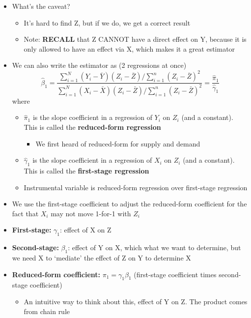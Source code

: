 \documentclass[10pt, oneside]{article}
\begin{document}
\begin{itemize}
\begin{itemize}
\begin{itemize}
        \end{itemize}
        \item What's the caveat?
        \begin{itemize}
            \item It's hard to find Z, but if we do, we get a correct result
            \item Note: \textbf{RECALL} that Z CANNOT have a direct effect on Y, because it is only allowed to have an effect via X, which makes it a great estimator
        \end{itemize}
        \item We can also write the estimator as (2 regressions at once)
        \[ \hat \beta_1 = \frac{\sum_{i=1}^N (Y_i - \bar Y) (Z_i - \bar Z) / \sum_{i=1}^n (Z_i - \bar Z)^2}{\sum_{i=1}^N (X_i - \bar X) (Z_i - \bar Z) / \sum_{i=1}^n (Z_i - \bar Z)^2} = \frac{\hat \pi_1}{\hat \gamma_1}\]
        where
        \begin{itemize}
            \item $\hat \pi_1$ is the slope coefficient in a regression of $Y_i$ on $Z_i$ (and a constant). This is called the \textbf{reduced-form regression}
            \begin{itemize}
                \item We first heard of reduced-form for supply and demand
            \end{itemize}
            \item $\hat \gamma_1$ is the slope coefficient in a regression of $X_i$ on $Z_i$ (and a constant). This is called the \textbf{first-stage regression}
            \item Instrumental variable is reduced-form regression over first-stage regression
        \end{itemize}
        \item We use the first-stage coefficient to adjust the reduced-form coefficient for the fact that $X_i$ may not move 1-for-1 with $Z_i$
        \item \textbf{First-stage:} $\gamma_1$: effect of X on Z
        \item \textbf{Second-stage:} $\beta_1$: effect of Y on X, which what we want to determine, but we need X to `mediate' the effect of Z on Y to determine X
        \item \textbf{Reduced-form coefficient:} $\pi_1 = \gamma_1 \beta_1$ (first-stage coefficient times second-stage coefficient)
        \begin{itemize}
            \item An intuitive way to think about this, effect of Y on Z. The product comes from chain rule

\end{itemize}
\end{itemize}
\end{itemize}
\end{document}
